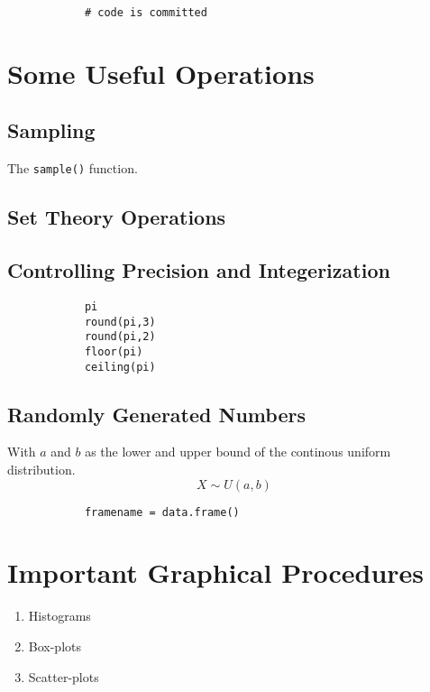 \documentclass[a4paper,12pt]{article}
\begin{document}
\begin{itemize}
\begin{itemize}
\begin{framed}
\begin{verbatim}
			# code is committed
			\end{verbatim}
		\end{framed}
		
		
		
		
		\section{Some Useful Operations}
		\subsection{Sampling}
		
		The \texttt{sample()} function.
		
		\subsection{Set Theory Operations}
		
		\subsection{Controlling Precision and Integerization}
		\begin{framed}
			\begin{verbatim}
			pi
			round(pi,3)
			round(pi,2)
			floor(pi)
			ceiling(pi)
			\end{verbatim}
		\end{framed}
		
		\subsection{Randomly Generated Numbers}
		With $a$ and $b$ as the lower and upper bound of the continous uniform distribution.
		\[X \sim U(a,b)\]

		\begin{framed}
			\begin{verbatim}
			framename = data.frame()
			\end{verbatim}
		\end{framed}
		\section{Important Graphical Procedures}
		\begin{enumerate}
			\item Histograms
			\item Box-plots
			\item Scatter-plots
		\end{enumerate}


\end{itemize}
\end{itemize}
\end{document}
